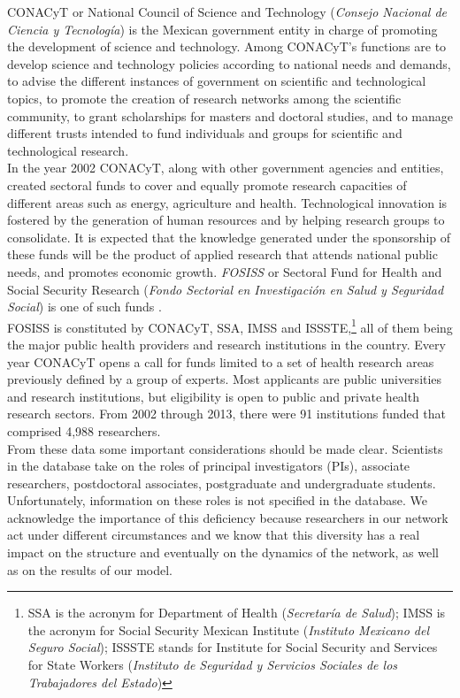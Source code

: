 \documentclass{bmcart}
\begin{document}
CONACyT or National Council of Science and Technology (\emph{Consejo
  Nacional de Ciencia y Tecnolog\'ia}) is the Mexican government
entity in charge of promoting the development of science and
technology.  Among CONACyT's functions are to develop science and
technology policies according to national needs and demands, to advise
the different instances of government on scientific and technological
topics, to promote the creation of research networks among the
scientific community, to grant scholarships for masters and doctoral
studies, and to manage different trusts intended to fund individuals
and groups for scientific and technological research.\\

In the year 2002 CONACyT, along with other government agencies and
entities, created sectoral funds to cover and equally promote research
capacities of different areas such as energy, agriculture and
health. Technological innovation is fostered by the generation of
human resources and by helping research groups to consolidate. It is
expected that the knowledge generated under the sponsorship of these
funds will be the product of applied research that attends national
public needs, and promotes economic growth.  {\color{red}
  \emph{FOSISS} or Sectoral Fund for Health and Social Security
  Research (\emph{Fondo Sectorial en Investigaci\'on en Salud y
    Seguridad Social}) is one of such funds
  \cite{Gonzalez-etal:2008}}.\\

FOSISS is constituted by CONACyT, SSA, IMSS and ISSSTE,\footnote{SSA
  is the acronym for Department of Health (\emph{Secretar\'ia de
    Salud}); IMSS is the acronym for Social Security Mexican Institute
  (\emph{Instituto Mexicano del Seguro Social}); ISSSTE stands for
  Institute for Social Security and Services for State Workers
  (\emph{Instituto de Seguridad y Servicios Sociales de los
    Trabajadores del Estado})} all of them being the major public
health providers and research institutions in the country. Every year
CONACyT opens a call for funds limited to a set of health research
areas previously defined by a group of experts. Most applicants are
public universities and research institutions, but eligibility is open
to public and private health research sectors.  From 2002 through
2013, there were 91 institutions funded that comprised 4,988
researchers.\\

From these data some important considerations should be made
clear. Scientists in the database take on the roles of principal
investigators (PIs), associate researchers, postdoctoral associates,
postgraduate and undergraduate students.  Unfortunately, information
on these roles is not specified in the database.  We acknowledge the
importance of this deficiency because researchers in our network act
under different circumstances and we know that this diversity has a
real impact on the structure and eventually on the dynamics of the
network, as well as on the results of our model.\\
\end{document}
